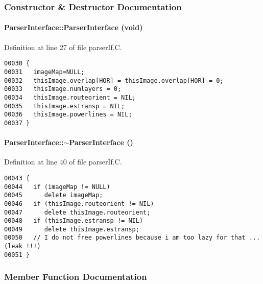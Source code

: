 \subsubsection{Constructor \& Destructor Documentation}
\label{ParserInterface_a0}
\paragraph{\setlength{\rightskip}{0pt plus 5cm}Parser\-Interface::Parser\-Interface (void)}\hfill



Definition at line 27 of file parser\-If.C.\small\begin{verbatim}00030 {
00031   imageMap=NULL;
00032   thisImage.overlap[HOR] = thisImage.overlap[HOR] = 0;
00033   thisImage.numlayers = 0;
00034   thisImage.routeorient = NIL;
00035   thisImage.estransp = NIL;
00036   thisImage.powerlines = NIL;
00037 }
\end{verbatim}\normalsize 
\label{ParserInterface_a1}
\paragraph{\setlength{\rightskip}{0pt plus 5cm}Parser\-Interface::$\sim$Parser\-Interface ()}\hfill



Definition at line 40 of file parser\-If.C.\small\begin{verbatim}00043 {
00044   if (imageMap != NULL)
00045      delete imageMap;
00046   if (thisImage.routeorient != NIL)
00047      delete thisImage.routeorient;
00048   if (thisImage.estransp != NIL)
00049      delete thisImage.estransp;
00050   // I do not free powerlines because i am too lazy for that ... (leak !!!)
00051 }
\end{verbatim}\normalsize 


\subsubsection{Member Function Documentation}
\label{ParserInterface_a9}
